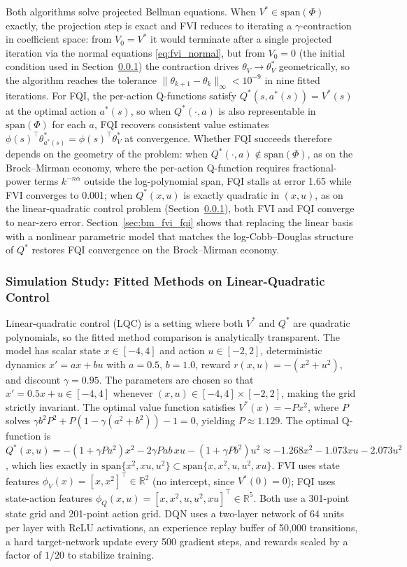Both algorithms solve projected Bellman equations. When $V^* \in \mathrm{span}(\Phi)$ exactly, the projection step is exact and FVI reduces to iterating a $\gamma$-contraction in coefficient space: from $V_0 = V^*$ it would terminate after a single projected iteration via the normal equations \eqref{eq:fvi_normal}, but from $V_0 = 0$ (the initial condition used in Section~\ref{sec:lqc_fvi_fqi}) the contraction drives $\theta_V \to \theta_V^*$ geometrically, so the algorithm reaches the tolerance $\|\theta_{k+1} - \theta_k\|_\infty < 10^{-9}$ in nine fitted iterations. For FQI, the per-action Q-functions satisfy $Q^*(s, a^*(s)) = V^*(s)$ at the optimal action $a^*(s)$, so when $Q^*(\cdot, a)$ is also representable in $\mathrm{span}(\Phi)$ for each $a$, FQI recovers consistent value estimates $\phi(s)^\top \theta_{a^*(s)}^* = \phi(s)^\top \theta_V^*$ at convergence. Whether FQI succeeds therefore depends on the geometry of the problem: when $Q^*(\cdot, a) \notin \mathrm{span}(\Phi)$, as on the Brock--Mirman economy, where the per-action Q-function requires fractional-power terms $k^{-n\alpha}$ outside the log-polynomial span, FQI stalls at error 1.65 while FVI converges to 0.001; when $Q^*(x,u)$ is exactly quadratic in $(x,u)$, as on the linear-quadratic control problem (Section~\ref{sec:lqc_fvi_fqi}), both FVI and FQI converge to near-zero error. Section~\ref{sec:bm_fvi_fqi} shows that replacing the linear basis with a nonlinear parametric model that matches the log-Cobb--Douglas structure of $Q^*$ restores FQI convergence on the Brock--Mirman economy.


\subsubsection{Simulation Study: Fitted Methods on Linear-Quadratic Control}
\label{sec:lqc_fvi_fqi}

Linear-quadratic control (LQC) is a setting where both $V^*$ and $Q^*$ are quadratic polynomials, so the fitted method comparison is analytically transparent. The model has scalar state $x \in [-4, 4]$ and action $u \in [-2, 2]$, deterministic dynamics $x' = ax + bu$ with $a = 0.5$, $b = 1.0$, reward $r(x,u) = -(x^2 + u^2)$, and discount $\gamma = 0.95$. The parameters are chosen so that $x' = 0.5x + u \in [-4, 4]$ whenever $(x, u) \in [-4,4] \times [-2,2]$, making the grid strictly invariant. The optimal value function satisfies $V^*(x) = -Px^2$, where $P$ solves $\gamma b^2 P^2 + P(1 - \gamma(a^2 + b^2)) - 1 = 0$, yielding $P \approx 1.129$. The optimal Q-function is $Q^*(x,u) = -(1+\gamma Pa^2)x^2 - 2\gamma Pab\,xu - (1+\gamma Pb^2)u^2 \approx -1.268x^2 - 1.073xu - 2.073u^2$, which lies exactly in $\mathrm{span}\{x^2, xu, u^2\} \subset \mathrm{span}\{x, x^2, u, u^2, xu\}$. FVI uses state features $\phi_V(x) = [x, x^2]^\top \in \mathbb{R}^2$ (no intercept, since $V^*(0) = 0$); FQI uses state-action features $\phi_Q(x,u) = [x, x^2, u, u^2, xu]^\top \in \mathbb{R}^5$. Both use a 301-point state grid and 201-point action grid. DQN uses a two-layer network of 64 units per layer with ReLU activations, an experience replay buffer of 50,000 transitions, a hard target-network update every 500 gradient steps, and rewards scaled by a factor of $1/20$ to stabilize training.

